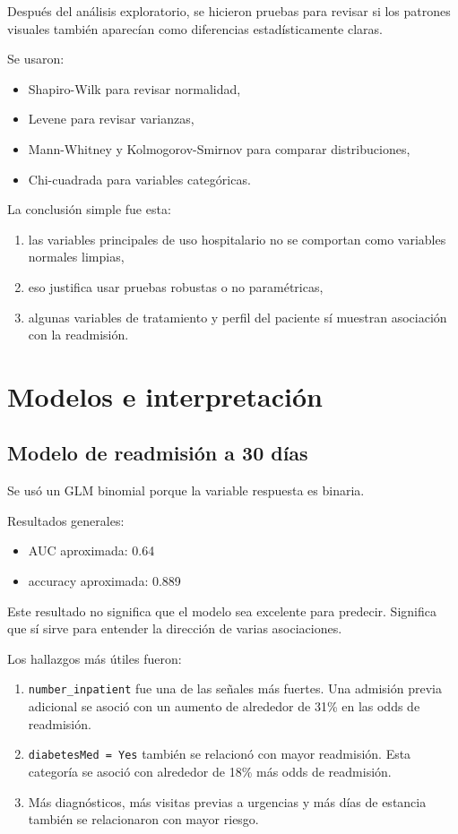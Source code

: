 \documentclass[12pt]{article}
\begin{document}
Después del análisis exploratorio, se hicieron pruebas para revisar si los patrones visuales también aparecían como diferencias estadísticamente claras.

Se usaron:
\begin{itemize}[leftmargin=1.6em]
    \item Shapiro-Wilk para revisar normalidad,
    \item Levene para revisar varianzas,
    \item Mann-Whitney y Kolmogorov-Smirnov para comparar distribuciones,
    \item Chi-cuadrada para variables categóricas.
\end{itemize}

La conclusión simple fue esta:
\begin{enumerate}[leftmargin=1.6em]
    \item las variables principales de uso hospitalario no se comportan como variables normales limpias,
    \item eso justifica usar pruebas robustas o no paramétricas,
    \item algunas variables de tratamiento y perfil del paciente sí muestran asociación con la readmisión.
\end{enumerate}

\section{Modelos e interpretación}

\subsection{Modelo de readmisión a 30 días}

Se usó un GLM binomial porque la variable respuesta es binaria.

Resultados generales:
\begin{itemize}[leftmargin=1.6em]
    \item AUC aproximada: 0.64
    \item accuracy aproximada: 0.889
\end{itemize}

Este resultado no significa que el modelo sea excelente para predecir. Significa que sí sirve para entender la dirección de varias asociaciones.

Los hallazgos más útiles fueron:
\begin{enumerate}[leftmargin=1.6em]
    \item \texttt{number\_inpatient} fue una de las señales más fuertes. Una admisión previa adicional se asoció con un aumento de alrededor de 31\% en las odds de readmisión.
    \item \texttt{diabetesMed = Yes} también se relacionó con mayor readmisión. Esta categoría se asoció con alrededor de 18\% más odds de readmisión.
    \item Más diagnósticos, más visitas previas a urgencias y más días de estancia también se relacionaron con mayor riesgo.
\end{enumerate}
\end{document}

